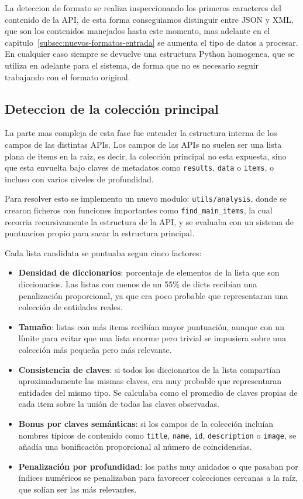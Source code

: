 La deteccion de formato se realiza inspeccionando los primeros caracteres del contenido de la API, de esta forma conseguiamos distinguir entre JSON y XML, que son 
los contenidos manejados hasta este momento, mas adelante en el capitulo~\ref{subsec:nuevos-formatos-entrada} se aumenta el tipo de datos a procesar. En cualquier caso 
siempre se devuelve una estructura Python homogenea, que se utiliza en adelante para el sistema, de forma que no es necesario seguir trabajando con el formato 
original.

\subsection{Deteccion de la colección principal}
\label{subsection:deteccion-coleccion-principal}

La parte mas compleja de esta fase fue entender la estructura interna de los campos de las distintas APIs. Los campos de las APIs no suelen ser una lista plana de items
en la raiz, es decir, la colección principal no esta expuesta, sino que esta envuelta bajo claves de metadatos como \texttt{results}, \texttt{data} o \texttt{items},
o incluso con varios niveles de profundidad. 

Para resolver esto se implemento un nuevo modulo: \texttt{utils/analysis}, donde se crearon ficheros con funciones importantes como \texttt{find\_main\_items}, la cual recorria recursivamente la estructura de la API, y se evaluaba con un sistema de puntuacion propio para sacar la estructura principal.

Cada lista candidata se puntuaba segun cinco factores:

\begin{itemize}
    \item \textbf{Densidad de diccionarios}: porcentaje de elementos de la lista que son diccionarios. Las listas con menos de un 55\% de dicts recibían una penalización proporcional, ya que era poco probable que representaran una colección de entidades reales.
    \item \textbf{Tamaño}: listas con más items recibían mayor puntuación, aunque con un límite para evitar que una lista enorme pero trivial se impusiera sobre una colección más pequeña pero más relevante.
    \item \textbf{Consistencia de claves}: si todos los diccionarios de la lista compartían aproximadamente las mismas claves, era muy probable que representaran entidades del mismo tipo. Se calculaba como el promedio de claves propias de cada item sobre la unión de todas las claves observadas.
    \item \textbf{Bonus por claves semánticas}: si los campos de la colección incluían nombres típicos de contenido como \texttt{title}, \texttt{name}, \texttt{id},    \texttt{description} o \texttt{image}, se añadía una bonificación proporcional al número de coincidencias.
    \item \textbf{Penalización por profundidad}: los paths muy anidados o que pasaban por índices numéricos se penalizaban para favorecer colecciones cercanas a la raíz, que solían ser las más relevantes.
\end{itemize}


